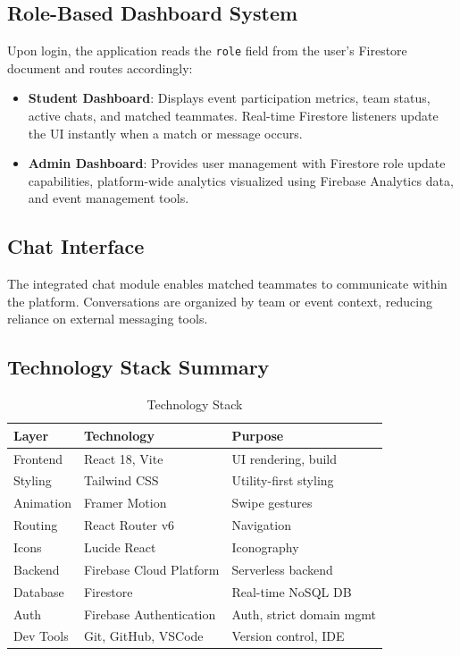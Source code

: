 \documentclass[conference]{IEEEtran}
\begin{document}
\subsection{Role-Based Dashboard System}
Upon login, the application reads the \texttt{role} field from the user's Firestore document and routes accordingly:
\begin{itemize}
    \item \textbf{Student Dashboard}: Displays event participation metrics, team status, active chats, and matched teammates. Real-time Firestore listeners update the UI instantly when a match or message occurs.
    \item \textbf{Admin Dashboard}: Provides user management with Firestore role update capabilities, platform-wide analytics visualized using Firebase Analytics data, and event management tools.
\end{itemize}

\subsection{Chat Interface}
The integrated chat module enables matched teammates to communicate within the platform. Conversations are organized by team or event context, reducing reliance on external messaging tools.

\subsection{Technology Stack Summary}

\begin{table}[htbp]
\caption{Technology Stack}
\label{tab:techstack}
\centering
\begin{tabular}{|p{}|p{}|p{}|}
\hline
\textbf{Layer} & \textbf{Technology} & \textbf{Purpose} \\
\hline
Frontend & React 18, Vite & UI rendering, build \\
\hline
Styling & Tailwind CSS & Utility-first styling \\
\hline
Animation & Framer Motion & Swipe gestures \\
\hline
Routing & React Router v6 & Navigation \\
\hline
Icons & Lucide React & Iconography \\
\hline
Backend & Firebase Cloud Platform & Serverless backend \\
\hline
Database & Firestore & Real-time NoSQL DB \\
\hline
Auth & Firebase Authentication & Auth, strict domain mgmt \\
\hline
Dev Tools & Git, GitHub, VSCode & Version control, IDE \\
\hline
\end{tabular}
\end{table}
\end{document}
